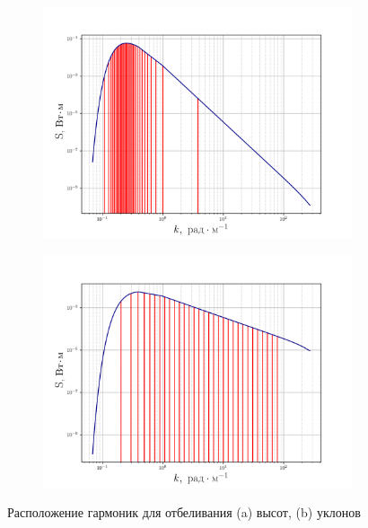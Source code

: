 \begin{figure}[H]
    \begin{subfigure}{0.49\linewidth}
        \includegraphics[width=\linewidth]{fig/fig1}
        \caption{}
    \end{subfigure}
    \begin{subfigure}{0.49\linewidth}
        \includegraphics[width=\linewidth]{fig/fig2}
        \caption{}
    \end{subfigure}
    \caption{Расположение гармоник для отбеливания (a) высот, (b) уклонов}
    \label{fig:13}
\end{figure}

